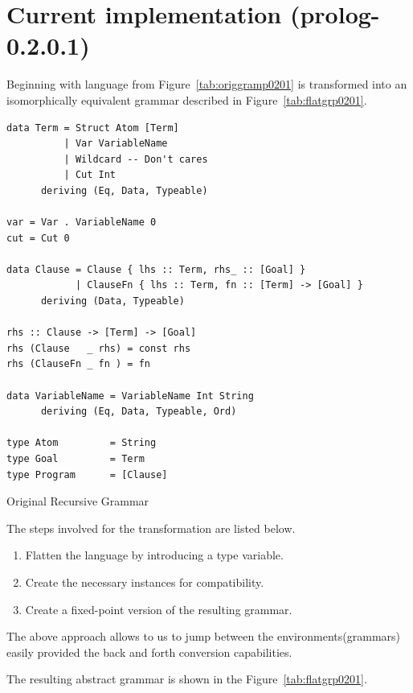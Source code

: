 \documentclass[thesis-solanki.tex]{subfiles}
\begin{document}
\section{Current implementation (prolog-0.2.0.1)}

Beginning with language from Figure~\ref{tab:origgramp0201} is transformed into an isomorphically equivalent
grammar described in Figure~\ref{tab:flatgrp0201}.

\begin{code-list}[h]
	\begin{singlespace}
		\begin{verbatim}
data Term = Struct Atom [Term]
          | Var VariableName
          | Wildcard -- Don't cares
          | Cut Int
      deriving (Eq, Data, Typeable)

var = Var . VariableName 0
cut = Cut 0

data Clause = Clause { lhs :: Term, rhs_ :: [Goal] }
            | ClauseFn { lhs :: Term, fn :: [Term] -> [Goal] }
      deriving (Data, Typeable)

rhs :: Clause -> [Term] -> [Goal]
rhs (Clause   _ rhs) = const rhs
rhs (ClauseFn _ fn ) = fn

data VariableName = VariableName Int String
      deriving (Eq, Data, Typeable, Ord)

type Atom         = String
type Goal         = Term
type Program      = [Clause]
		\end{verbatim}
	\end{singlespace}
	\caption{Original Recursive Grammar}
\label{tab:origgramp0201}
\end{code-list}


The steps involved for the transformation are listed below.
\begin{enumerate}
\item Flatten the language by introducing a type variable.

\item Create the necessary instances for \cite{unification-fd-lib} compatibility.

\item Create a fixed-point version of the resulting grammar.
\end{enumerate}

The above approach allows to us to jump between the environments(grammars) easily provided the back and forth conversion capabilities.

The resulting abstract grammar is shown in the Figure~\ref{tab:flatgrp0201}.
\end{document}
